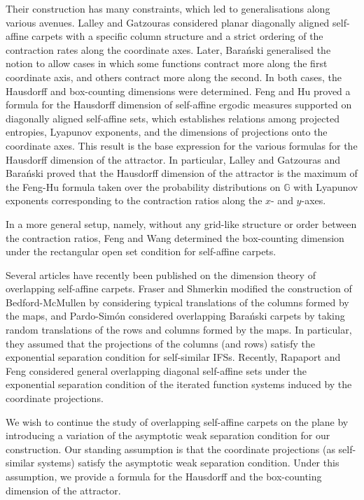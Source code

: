 \documentclass[a4paper, 11pt]{article}
\numberwithin{equation}{section}
\theoremstyle{plain}
\theoremstyle{remark}
\theoremstyle{definition}
\begin{document}
Their construction has many constraints, which led to generalisations along various avenues. Lalley and Gatzouras \cite{MR1183358} considered planar diagonally aligned self-affine carpets with a specific column structure and a strict ordering of the contraction rates along the coordinate axes. Later, Bara\'nski \cite{MR2298824} generalised the notion to allow cases in which some functions contract more along the first coordinate axis, and others contract more along the second. In both cases, the Hausdorff and box-counting dimensions were determined. Feng and Hu \cite{MR2560042} proved a formula for the Hausdorff dimension of self-affine ergodic measures supported on diagonally aligned self-affine sets, which establishes relations among projected entropies, Lyapunov exponents, and the dimensions of projections onto the coordinate axes. This result is the base expression for the various formulas for the Hausdorff dimension of the attractor. In particular, Lalley and Gatzouras \cite{MR1183358} and Bara\'nski \cite{MR2298824} proved that the Hausdorff dimension of the attractor is the maximum of the Feng-Hu formula taken over the probability distributions on $\mathbb{G}$ with Lyapunov exponents corresponding to the contraction ratios along the $x$- and $y$-axes.

In a more general setup, namely, without any grid-like structure or order between the contraction ratios, Feng and Wang \cite{MR2128947} determined the box-counting dimension under the rectangular open set condition for self-affine carpets.

Several articles have recently been published on the dimension theory of overlapping self-affine carpets. Fraser and Shmerkin \cite{MR3570020} modified the construction of Bedford-McMullen by considering typical translations of the columns formed by the maps, and Pardo-Sim\'on \cite{simon2017dimensionsoverlappinggeneralizationbaranski} considered overlapping Bara\'nski carpets by taking random translations of the rows and columns formed by the maps. In particular, they assumed that the projections of the columns (and rows) satisfy the exponential separation condition for self-similar IFSs. Recently, Rapaport \cite{rapaport2023dimensiondiagonalselfaffinesets} and Feng \cite{feng2025dimensiondiagonalselfaffinemeasures} considered general overlapping diagonal self-affine sets under the exponential separation condition of the iterated function systems induced by the coordinate projections.

We wish to continue the study of overlapping self-affine carpets on the plane by introducing a variation of the asymptotic weak separation condition for our construction. Our standing assumption is that the coordinate projections (as self-similar systems) satisfy the asymptotic weak separation condition. Under this assumption, we provide a formula for the Hausdorff and the box-counting dimension of the attractor.
\end{document}
